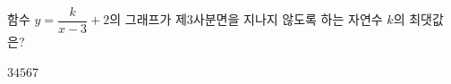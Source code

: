 함수 $y=\dfrac{k}{x-3}+2$의 그래프가 제$3$사분면을 지나지 않도록 하는 자연수 $k$의 최댓값은?
\begin{choices32}{$3$}{$4$}{$5$}{$6$}{$7$}\end{choices32}
